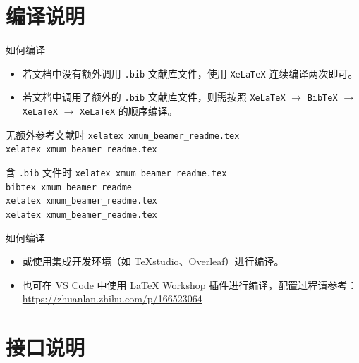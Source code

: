 \documentclass[aspectratio=169,11pt]{ctexbeamer}
\begin{document}
\section{编译说明}

\begin{frame}{如何编译}
    \begin{itemize}
        \item 若文档中没有额外调用 \texttt{.bib} 文献库文件，使用 \texttt{XeLaTeX} 连续编译两次即可。
        \item 若文档中调用了额外的 \texttt{.bib} 文献库文件，则需按照 \texttt{XeLaTeX} $\to$ \texttt{BibTeX} $\to$ \texttt{XeLaTeX} $\to$ \texttt{XeLaTeX} 的顺序编译。
    \end{itemize}

    \begin{exampleblock}{无额外参考文献时}
        \texttt{xelatex xmum\_beamer\_readme.tex}\\
        \texttt{xelatex xmum\_beamer\_readme.tex}
    \end{exampleblock}

    \begin{exampleblock}{含 \texttt{.bib} 文件时}
        \texttt{xelatex xmum\_beamer\_readme.tex}\\
        \texttt{bibtex xmum\_beamer\_readme}\\
        \texttt{xelatex xmum\_beamer\_readme.tex}\\
        \texttt{xelatex xmum\_beamer\_readme.tex}
    \end{exampleblock}
\end{frame}

\begin{frame}{如何编译}
    \begin{itemize}
        \item 或使用集成开发环境（如 \href{https://texstudio.sourceforge.net}{TeXstudio}、\href{https://www.overleaf.com/project}{Overleaf}）进行编译。
        \item 也可在 VS Code 中使用 \href{https://marketplace.visualstudio.com/items?itemName=James-Yu.latex-workshop}{LaTeX Workshop} 插件进行编译，配置过程请参考：\url{https://zhuanlan.zhihu.com/p/166523064}
    \end{itemize}
\end{frame}

\section{接口说明}
\end{document}
